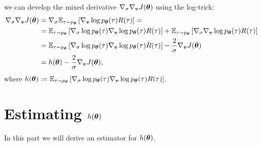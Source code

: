 we can develop the mixed derivative $\nabla_{\sigma}\nabla_{\vv}J(\vtheta)$ using the log-trick:
\begin{align*}
\nabla_{\sigma}\gradJ[\vv]{\vtheta} &= \nabla_{\sigma}\EV[\tau\sim p_{\vtheta}]{\score{\vv}R(\tau)} = \\
&= \EV[\tau\sim p_{\vtheta}]{\score{\sigma}\score{\vv}R(\tau)} + \EV[\tau\sim p_{\vtheta}]{\nabla_{\sigma}\score{\vv}R(\tau)} \\
& = \EV[\tau\sim p_{\vtheta}]{\score{\sigma}\score{\vv}R(\tau)} - \frac{2}{\sigma}\gradJ[\vv]{\vtheta} \\
&= h(\vtheta) - \frac{2}{\sigma}\gradJ[\vv]{\vtheta},
\end{align*}
where $h(\vtheta)\coloneqq\EV[\tau\sim p_{\vtheta}]{\score{\sigma}\score{\vv}R(\tau)}$.


\section{Estimating $h(\vtheta)$}

In this part we will derive an estimator for $h(\vtheta)$. 

